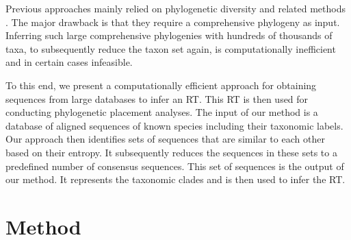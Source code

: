Previous approaches mainly relied on phylogenetic diversity
\cite{Faith1992,Pardi2005,Minh2006} and related methods \cite{Matsen2013}.
The major drawback is that they require a comprehensive phylogeny as input.
Inferring such large comprehensive phylogenies with hundreds of thousands of taxa,
to subsequently reduce the taxon set again, is computationally inefficient and in certain cases infeasible.

To this end, we present a computationally efficient approach
for obtaining sequences from large databases to infer an \ac{RT}.
This \ac{RT} is then used for conducting phylogenetic placement analyses.
The input of our method is a database of aligned sequences of known species including their taxonomic labels.
Our approach then identifies sets of sequences that are similar to each other based on their entropy.
It subsequently reduces the sequences in these sets to a predefined number of consensus sequences.
This set of sequences is the output of our method.
It represents the taxonomic clades and is then used to infer the \ac{RT}.


\section{Method}
\label{ch:AutomaticTrees:sec:Method}


